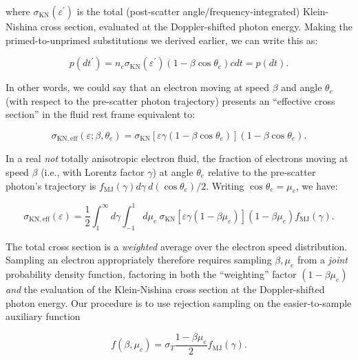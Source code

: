 \documentclass[letterpaper]{article}
\begin{document}
\begin{enumerate}
\noindent where $\sigma_\mathrm{KN} (\varepsilon^\prime)$ is the total (post-scatter angle/frequency-integrated) Klein-Nishina cross section, evaluated at the Doppler-shifted photon energy. Making the primed-to-unprimed substitutions we derived earlier, we can write this as:

\begin{equation}
p(dt^\prime) = n_e \sigma_\mathrm{KN} (\varepsilon^\prime) (1 - \beta \cos \theta_e) c dt = p(dt).
\end{equation}

\noindent In other words, we could say that an electron moving at speed $\beta$ and angle $\theta_e$ (with respect to the pre-scatter photon trajectory) presents an ``effective cross section'' in the fluid rest frame equivalent to:

\begin{equation}
\sigma_\mathrm{KN,eff} (\varepsilon; \beta, \theta_e) = \sigma_\mathrm{KN} \left[ \varepsilon \gamma (1 - \beta \cos \theta_e)\right] (1 - \beta \cos \theta_e).
\end{equation}

In a real \emph{not} totally anisotropic electron fluid, the fraction of electrons moving at speed $\beta$ (i.e., with Lorentz factor $\gamma$) at angle $\theta_e$ relative to the pre-scatter photon's trajectory is $f_\mathrm{MJ} (\gamma) d\gamma\ d (\cos \theta_e)/2$. Writing $\cos \theta_e = \mu_e$, we have:

\begin{equation}
\sigma_\mathrm{KN,eff}(\varepsilon) = \frac{1}{2} \int_1^\infty d\gamma \int_{-1}^1 d\mu_e\ \sigma_\mathrm{KN} \left[ \varepsilon \gamma (1 - \beta \mu_e ) \right] (1 - \beta \mu_e) f_\mathrm{MJ} (\gamma).
\end{equation}

The total cross section is a \emph{weighted} average over the electron speed distribution. Sampling an electron appropriately therefore requires sampling $\beta, \mu_e$ from a \emph{joint} probability density function, factoring in both the ``weighting'' factor $(1 - \beta \mu_e)$ \emph{and} the evaluation of the Klein-Nishina cross section at the Doppler-shifted photon energy. Our procedure is to use rejection sampling on the easier-to-sample auxiliary function

\begin{equation}
f(\beta, \mu_e) = \sigma_T \frac{1 - \beta \mu_e}{2} f_\mathrm{MJ} (\gamma).
\end{equation}


\end{enumerate}
\end{document}
